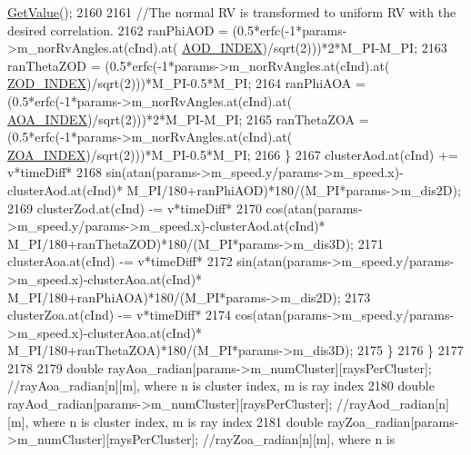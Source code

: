 \begin{DoxyCode}
      \hyperlink{classns3_1_1NormalRandomVariable_a0134d131477bc439cc6ff7cbe84b03a9}{GetValue}();
2160 
2161                                 \textcolor{comment}{//The normal RV is transformed to uniform RV with the desired correlation.}
2162                                 ranPhiAOD = (0.5*erfc(-1*params->m\_norRvAngles.at(cInd).at(
      \hyperlink{mmwave-3gpp-channel_8h_af0ca9ddb9e3346bd827d865de86dc5cb}{AOD\_INDEX})/sqrt(2)))*2*M\_PI-M\_PI;
2163                                 ranThetaZOD = (0.5*erfc(-1*params->m\_norRvAngles.at(cInd).at(
      \hyperlink{mmwave-3gpp-channel_8h_ae854b569d54c7f279a42fae34ad464f9}{ZOD\_INDEX})/sqrt(2)))*M\_PI-0.5*M\_PI;
2164                                 ranPhiAOA = (0.5*erfc(-1*params->m\_norRvAngles.at(cInd).at(
      \hyperlink{mmwave-3gpp-channel_8h_a7f1d5772b72f2ce425d85a2b41e8842f}{AOA\_INDEX})/sqrt(2)))*2*M\_PI-M\_PI;
2165                                 ranThetaZOA = (0.5*erfc(-1*params->m\_norRvAngles.at(cInd).at(
      \hyperlink{mmwave-3gpp-channel_8h_a86ab9a21bb66f50f7f4b0c0a0ee1f474}{ZOA\_INDEX})/sqrt(2)))*M\_PI-0.5*M\_PI;
2166                         \}
2167                         clusterAod.at(cInd) += v*timeDiff*
2168                                         sin(atan(params->m\_speed.y/params->m\_speed.x)-clusterAod.at(cInd)*
      M\_PI/180+ranPhiAOD)*180/(M\_PI*params->m\_dis2D);
2169                         clusterZod.at(cInd) -= v*timeDiff*
2170                                         cos(atan(params->m\_speed.y/params->m\_speed.x)-clusterAod.at(cInd)*
      M\_PI/180+ranThetaZOD)*180/(M\_PI*params->m\_dis3D);
2171                         clusterAoa.at(cInd) -= v*timeDiff*
2172                                         sin(atan(params->m\_speed.y/params->m\_speed.x)-clusterAoa.at(cInd)*
      M\_PI/180+ranPhiAOA)*180/(M\_PI*params->m\_dis2D);
2173                         clusterZoa.at(cInd) -= v*timeDiff*
2174                                         cos(atan(params->m\_speed.y/params->m\_speed.x)-clusterAoa.at(cInd)*
      M\_PI/180+ranThetaZOA)*180/(M\_PI*params->m\_dis3D);
2175                 \}
2176         \}
2177 
2178 
2179         \textcolor{keywordtype}{double} rayAoa\_radian[params->m\_numCluster][raysPerCluster]; \textcolor{comment}{//rayAoa\_radian[n][m], where n is
       cluster index, m is ray index}
2180         \textcolor{keywordtype}{double} rayAod\_radian[params->m\_numCluster][raysPerCluster]; \textcolor{comment}{//rayAod\_radian[n][m], where n is
       cluster index, m is ray index}
2181         \textcolor{keywordtype}{double} rayZoa\_radian[params->m\_numCluster][raysPerCluster]; \textcolor{comment}{//rayZoa\_radian[n][m], where n is
}
\end{DoxyCode}
